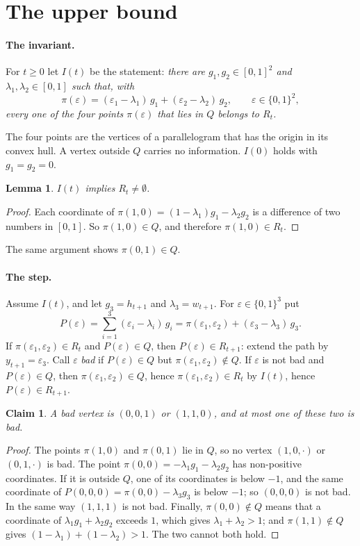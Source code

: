 \documentclass[11pt]{article}
\newtheorem{lemma}[theorem]{Lemma}
\newtheorem{claim}[theorem]{Claim}
\theoremstyle{definition}
\newcommand{\eps}{\varepsilon}
\begin{document}
\section{The upper bound}\label{sec:upper}

\paragraph{The invariant.}
For $t\ge0$ let $I(t)$ be the statement: \emph{there are
$g_1,g_2\in[0,1]^2$ and $\lambda_1,\lambda_2\in[0,1]$ such that, with
\[
 \pi(\eps)=(\eps_1-\lambda_1)\,g_1+(\eps_2-\lambda_2)\,g_2,
 \qquad\eps\in\{0,1\}^2,
\]
every one of the four points $\pi(\eps)$ that lies in $Q$ belongs to
$R_t$.}

The four points are the vertices of a parallelogram that has the origin
in its convex hull.  A vertex outside $Q$ carries no information.
$I(0)$ holds with $g_1=g_2=0$.

\begin{lemma}\label{lem:nonempty}
$I(t)$ implies $R_t\ne\emptyset$.
\end{lemma}
\begin{proof}
Each coordinate of $\pi(1,0)=(1-\lambda_1)g_1-\lambda_2g_2$ is a
difference of two numbers in $[0,1]$.  So $\pi(1,0)\in Q$, and therefore
$\pi(1,0)\in R_t$.
\end{proof}
The same argument shows $\pi(0,1)\in Q$.

\paragraph{The step.}
Assume $I(t)$, and let $g_3=h_{t+1}$ and $\lambda_3=w_{t+1}$.  For
$\eps\in\{0,1\}^3$ put
\[
 P(\eps)=\sum_{i=1}^{3}(\eps_i-\lambda_i)\,g_i
 =\pi(\eps_1,\eps_2)+(\eps_3-\lambda_3)\,g_3 .
\]
If $\pi(\eps_1,\eps_2)\in R_t$ and $P(\eps)\in Q$, then
$P(\eps)\in R_{t+1}$: extend the path by $y_{t+1}=\eps_3$.  Call $\eps$
\emph{bad} if $P(\eps)\in Q$ but $\pi(\eps_1,\eps_2)\notin Q$.  If $\eps$
is not bad and $P(\eps)\in Q$, then $\pi(\eps_1,\eps_2)\in Q$, hence
$\pi(\eps_1,\eps_2)\in R_t$ by $I(t)$, hence $P(\eps)\in R_{t+1}$.

\begin{claim}\label{cl:bad}
A bad vertex is $(0,0,1)$ or $(1,1,0)$, and at most one of these two is
bad.
\end{claim}
\begin{proof}
The points $\pi(1,0)$ and $\pi(0,1)$ lie in $Q$, so no vertex
$(1,0,\cdot)$ or $(0,1,\cdot)$ is bad.  The point
$\pi(0,0)=-\lambda_1g_1-\lambda_2g_2$ has non-positive coordinates.  If it
is outside $Q$, one of its coordinates is below $-1$, and the same
coordinate of $P(0,0,0)=\pi(0,0)-\lambda_3g_3$ is below $-1$; so
$(0,0,0)$ is not bad.  In the same way $(1,1,1)$ is not bad.  Finally,
$\pi(0,0)\notin Q$ means that a coordinate of
$\lambda_1g_1+\lambda_2g_2$ exceeds $1$, which gives
$\lambda_1+\lambda_2>1$; and $\pi(1,1)\notin Q$ gives
$(1-\lambda_1)+(1-\lambda_2)>1$.  The two cannot both hold.
\end{proof}
\end{document}
